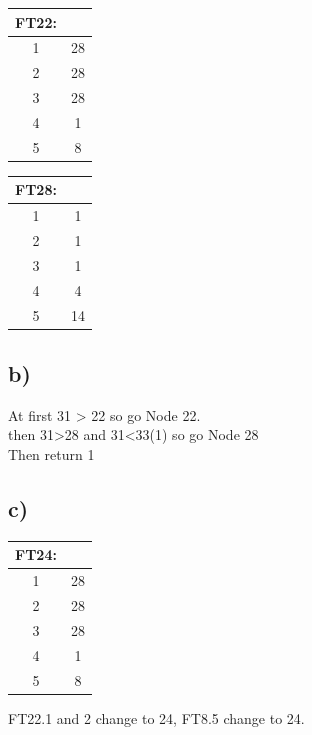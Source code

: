 \documentclass{article}
\begin{document}
\begin{table}[H]
           \centering
           \begin{tabular}{|c|c|}
               \hline
               FT22:& \\
               \hline
               1&28\\
               \hline
               2&28\\
               \hline
               3&28\\
               \hline
               4&1\\
               \hline
               5&8\\
               \hline
           \end{tabular}

           \centering
           \begin{tabular}{|c|c|}
               \hline
               FT28:& \\
               \hline
               1&1\\
               \hline
               2&1\\
               \hline
               3&1\\
               \hline
               4&4\\
               \hline
               5&14\\
               \hline
           \end{tabular}

        \end{table}
   



    
\subsection*{b)}
At first 31 > 22 so go Node 22.\\
then 31>28 and 31<33(1) so go Node 28\\
Then return 1
\subsection*{c)}
\begin{tabular}{|c|c|}
    \hline
    FT24:& \\
    \hline
    1&28\\
    \hline
    2&28\\
    \hline
    3&28\\
    \hline
    4&1\\
    \hline
    5&8\\
    \hline
\end{tabular}
FT22.1 and 2 change to 24, FT8.5 change to 24.
    
\end{document}
